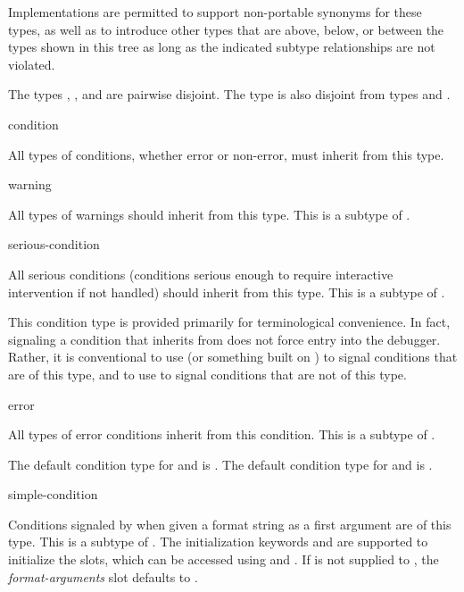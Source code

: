 Implementations are permitted to support non-portable synonyms for these types,
as well as to introduce other types that are above, below, or between the types
shown in this tree as long as the indicated subtype relationships are not
violated.

The types , , and  are
pairwise disjoint. The type  is also disjoint from types
 and .

\begin{defun}[Type]
condition

All types of conditions, whether error or non-error, must inherit from this
type.
\end{defun}

\begin{defun}[Type]
warning

All types of warnings should inherit from this type.  This is a subtype of
.
\end{defun}

\begin{defun}[Type]
serious-condition

All serious conditions (conditions serious enough to require interactive
intervention if not handled) should inherit from this type. This is a subtype of
.

This condition type is provided primarily for terminological convenience.  In
fact, signaling a condition that inherits from  does not
force entry into the debugger. Rather, it is conventional to use  (or
something built on ) to signal conditions that are of this type, and
to use  to signal conditions that are not of this type.
\end{defun}

\begin{defun}[Type]
error

All types of error conditions inherit from this condition.  This is a subtype of
.
\end{defun}

The default condition type for  and  is .
The default condition type for  and  is
.

\begin{defun}[Type]
simple-condition

Conditions signaled by  when given a format string as a first
argument are of this type. This is a subtype of .  The
initialization keywords  and  are
supported to initialize the slots, which can be accessed using
 and
.  If  is not
supplied to , the \emph{format-arguments} slot defaults to
.
\end{defun}

